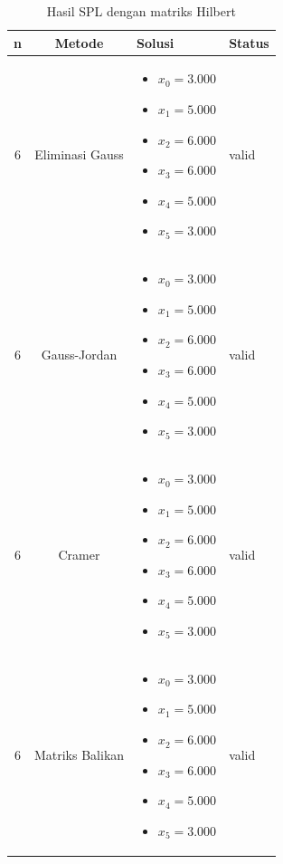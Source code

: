 \documentclass[12pt,a4paper]{report}
\begin{document}
\begin{table}[H]
    \centering
    \caption{Hasil SPL dengan matriks Hilbert}
    \begin{tabular}{|c|c|p{5cm}|l|}
        \hline
        \textbf{n} & \textbf{Metode} & \textbf{Solusi} & \textbf{Status} \\
        \hline
        6 & Eliminasi Gauss & 
        \begin{itemize}
            \item $x_0 = 3.000$
            \item $x_1 = 5.000$
            \item $x_2 = 6.000$
            \item $x_3 = 6.000$
            \item $x_4 = 5.000$
            \item $x_5 = 3.000$
        \end{itemize}
        & valid \\
        \hline
        6 & Gauss-Jordan & 
        \begin{itemize}
            \item $x_0 = 3.000$
            \item $x_1 = 5.000$
            \item $x_2 = 6.000$
            \item $x_3 = 6.000$
            \item $x_4 = 5.000$
            \item $x_5 = 3.000$
        \end{itemize}
        & valid \\
        \hline
        6 & Cramer & 
        \begin{itemize}
            \item $x_0 = 3.000$
            \item $x_1 = 5.000$
            \item $x_2 = 6.000$
            \item $x_3 = 6.000$
            \item $x_4 = 5.000$
            \item $x_5 = 3.000$
        \end{itemize}
        & valid \\
        \hline
        6 & Matriks Balikan & 
        \begin{itemize}
            \item $x_0 = 3.000$
            \item $x_1 = 5.000$
            \item $x_2 = 6.000$
            \item $x_3 = 6.000$
            \item $x_4 = 5.000$
            \item $x_5 = 3.000$
        \end{itemize}
        & valid \\
        \hline
        \end{tabular}
\end{table}
\end{document}
